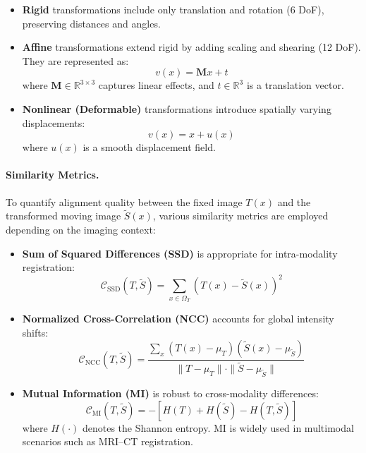 \begin{itemize}
    \item \textbf{Rigid} transformations include only translation and rotation (6 DoF), preserving distances and angles.
    \item \textbf{Affine} transformations extend rigid by adding scaling and shearing (12 DoF). They are represented as:
    \begin{equation}
        v(x) = \mathbf{M}x + t
        \label{eq:affine}
    \end{equation}
    where \( \mathbf{M} \in \mathbb{R}^{3 \times 3} \) captures linear effects, and \( t \in \mathbb{R}^3 \) is a translation vector.
    
    \item \textbf{Nonlinear (Deformable)} transformations introduce spatially varying displacements:
    \begin{equation}
        v(x) = x + u(x)
        \label{eq:deformable}
    \end{equation}
    where \( u(x) \) is a smooth displacement field. 
    
\end{itemize}

\paragraph{Similarity Metrics.}
To quantify alignment quality between the fixed image \( T(x) \) and the transformed moving image \( \tilde{S}(x) \), various similarity metrics are employed depending on the imaging context:
\begin{itemize}
    \item \textbf{Sum of Squared Differences (SSD)} is appropriate for intra-modality registration:
    \begin{equation}
        \mathcal{C}_{\text{SSD}}(T, \tilde{S}) = \sum_{x \in \Omega_T} \left( T(x) - \tilde{S}(x) \right)^2
        \label{eq:ssd}
    \end{equation}
    \item \textbf{Normalized Cross-Correlation (NCC)} accounts for global intensity shifts:
    \begin{equation}
        \mathcal{C}_{\text{NCC}}(T, \tilde{S}) = \frac{\sum_x (T(x) - \mu_T)(\tilde{S}(x) - \mu_{\tilde{S}})}{\|T - \mu_T\| \cdot \|\tilde{S} - \mu_{\tilde{S}}\|}
        \label{eq:ncc}
    \end{equation}
    \item \textbf{Mutual Information (MI)} is robust to cross-modality differences:
    \begin{equation}
        \mathcal{C}_{\text{MI}}(T, \tilde{S}) = - \left[ H(T) + H(\tilde{S}) - H(T, \tilde{S}) \right]
        \label{eq:mi}
    \end{equation}
    where \( H(\cdot) \) denotes the Shannon entropy. MI is widely used in multimodal scenarios such as MRI–CT registration.
\end{itemize}

